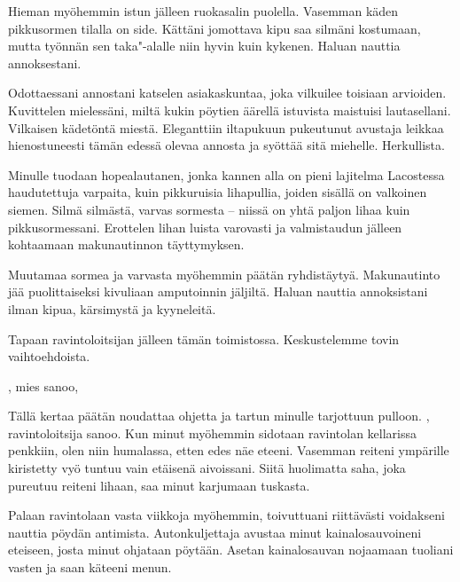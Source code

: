 \indent{}Hieman my\"{o}hemmin istun j\"{a}lleen ruokasalin puolella. Vasemman k\"{a}den pikkusormen tilalla on side. K\"{a}tt\"{a}ni jomottava kipu saa silm\"{a}ni kostumaan, mutta ty\"{o}nn\"{a}n sen taka"-alalle niin hyvin kuin kykenen. Haluan nauttia annoksestani.

\indent{}Odottaessani annostani katselen asiakaskuntaa, joka vilkuilee toisiaan arvioiden. Kuvittelen mieless\"{a}ni, milt\"{a} kukin p\"{o}ytien \"{a}\"{a}rell\"{a} istuvista maistuisi lautasellani. Vilkaisen k\"{a}det\"{o}nt\"{a} miest\"{a}. Eleganttiin iltapukuun pukeutunut avustaja leikkaa hienostuneesti t\"{a}m\"{a}n edess\"{a} olevaa annosta ja sy\"{o}tt\"{a}\"{a} sit\"{a} miehelle. Herkullista.

\indent{}Minulle tuodaan hopealautanen, jonka kannen alla on pieni lajitelma Lacostessa haudutettuja varpaita, kuin pikkuruisia lihapullia, joiden sis\"{a}ll\"{a} on valkoinen siemen. Silm\"{a} silm\"{a}st\"{a}, varvas sormesta -- niiss\"{a} on yht\"{a} paljon lihaa kuin pikkusormessani. Erottelen lihan luista varovasti ja valmistaudun j\"{a}lleen kohtaamaan makunautinnon t\"{a}yttymyksen.



\subchapter{}\noindent{}Muutamaa sormea ja varvasta my\"{o}hemmin p\"{a}\"{a}t\"{a}n ryhdist\"{a}yty\"{a}. Makunautinto j\"{a}\"{a} puolittaiseksi kivuliaan amputoinnin j\"{a}ljilt\"{a}. Haluan nauttia annoksistani ilman kipua, k\"{a}rsimyst\"{a} ja kyyneleit\"{a}.

\indent{}Tapaan ravintoloitsijan j\"{a}lleen t\"{a}m\"{a}n toimistossa. Keskustelemme tovin vaihtoehdoista.

\indent{}, mies sanoo, 

\indent{}T\"{a}ll\"{a} kertaa p\"{a}\"{a}t\"{a}n noudattaa ohjetta ja tartun minulle tarjottuun pulloon. , ravintoloitsija sanoo. Kun minut my\"{o}hemmin sidotaan ravintolan kellarissa penkkiin, olen niin humalassa, etten edes n\"{a}e eteeni. Vasemman reiteni ymp\"{a}rille kiristetty vy\"{o} tuntuu vain et\"{a}isen\"{a} aivoissani. Siit\"{a} huolimatta saha, joka pureutuu reiteni lihaan, saa minut karjumaan tuskasta.



\subchapter{}\noindent{}Palaan ravintolaan vasta viikkoja my\"{o}hemmin, toivuttuani riitt\"{a}v\"{a}sti voidakseni nauttia p\"{o}yd\"{a}n antimista. Autonkuljettaja avustaa minut kainalosauvoineni eteiseen, josta minut ohjataan p\"{o}yt\"{a}\"{a}n. Asetan kainalosauvan nojaamaan tuoliani vasten ja saan k\"{a}teeni menun.

